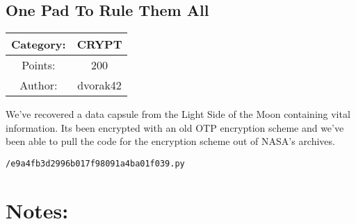 \begin{center}
\section*{One Pad To Rule Them All}
{\large
\begin{tabular}{| c c |}
\hline
Category: & CRYPT\\\hline
Points: & 200\\\hline
Author: & dvorak42\\\hline
\end{tabular}
}
\end{center}
\vspace{0.5in}

{\large
We've recovered a data capsule from the Light Side of the Moon containing vital information. Its been encrypted with an old OTP encryption scheme and we've been able to pull the code for the encryption scheme out of NASA's archives.
}
\vspace{0.25in}
\begin{center}
  {\Large\tt /e9a4fb3d2996b017f98091a4ba01f039.py}
\end{center}

\vspace{0.25in}
\section*{Notes:}
